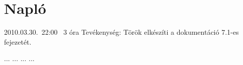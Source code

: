 %
\section{Napló}

\begin{naplo}

\bejegyzes
{2010.03.30.~22:00~}
{3 óra}
{\torok}
{Tevékenység: Török elkészíti a dokumentáció 7.1-es fejezetét.}

\bejegyzes
{...}
{...}
{...}
{...}


\end{naplo}

